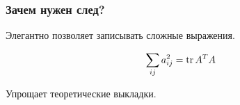 \begin{frame}
    \frametitle{Зачем нужен след?}

    \pause
    Элегантно позволяет записывать сложные выражения.
    
    \[
    \sum_{ij} a_{ij}^2 = \trace A^T A    
    \]

    \pause
    
    Упрощает теоретические выкладки. 

\end{frame}


